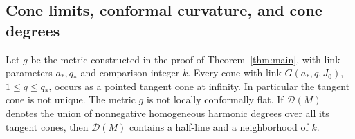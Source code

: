 \subsection{Cone limits, conformal curvature, and cone degrees}
\begin{proposition}
\label{prop:cone-consequences}
Let \(g\) be the metric constructed in the proof of Theorem~\ref{thm:main},
with link parameters \(a_*,q_*\) and comparison integer \(k\).
Every cone with link \(G(a_*,q,J_0)\), \(1\leq q\leq q_*\), occurs
as a pointed tangent cone at infinity. In particular the tangent cone is
not unique. The metric \(g\) is not locally conformally flat. If
\(\mathcal D(M)\) denotes the union of nonnegative homogeneous harmonic
degrees over all its tangent cones, then \(\mathcal D(M)\) contains a
half-line and a neighborhood of \(k\).
\end{proposition}

